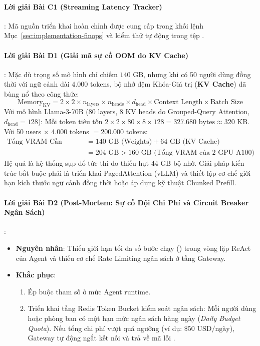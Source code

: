 \paragraph{Lời giải Bài C1 (Streaming Latency Tracker)}:
Mã nguồn triển khai hoàn chỉnh được cung cấp trong khối lệnh Mục~\ref{sec:implementation-finops} và kiểm thử tự động trong tệp .

\paragraph{Lời giải Bài D1 (Giải mã sự cố OOM do KV Cache)}:
Mặc dù trọng số mô hình chỉ chiếm $140\text{ GB}$, nhưng khi có 50 người dùng đồng thời với ngữ cảnh dài $4.000$ tokens, bộ nhớ đệm Khóa-Giá trị (\textbf{KV Cache}) đã bùng nổ theo công thức:
\begin{equation*}
\text{Memory}_{\text{KV}} = 2 \times 2 \times n_{\text{layers}} \times n_{\text{heads}} \times d_{\text{head}} \times \text{Context Length} \times \text{Batch Size}
\end{equation*}
Với mô hình Llama-3-70B ($80$ layers, $8$ KV heads do Grouped-Query Attention, $d_{\text{head}}=128$):
Mỗi token tiêu tốn $2 \times 2 \times 80 \times 8 \times 128 = 327.680\text{ bytes} \approx 320\text{ KB}$.
Với 50 users $\times$ 4.000 tokens $= 200.000\text{ tokens}$:
\begin{align*}
\text{Tổng VRAM Cần Thiết} &= 140\text{ GB (Weights)} + 64\text{ GB (KV Cache)} \\
&= 204\text{ GB} > 160\text{ GB (Tổng VRAM của 2 GPU A100)}
\end{align*}
Hệ quả là hệ thống sụp đổ tức thì do thiếu hụt $44\text{ GB}$ bộ nhớ. Giải pháp kiến trúc bắt buộc phải là triển khai PagedAttention (vLLM) và thiết lập cơ chế giới hạn kích thước ngữ cảnh đồng thời hoặc áp dụng kỹ thuật Chunked Prefill.

\paragraph{Lời giải Bài D2 (Post-Mortem: Sự cố Đội Chi Phí và Circuit Breaker Ngân Sách)}:
\begin{itemize}
  \item \textbf{Nguyên nhân}: Thiếu giới hạn tối đa số bước chạy () trong vòng lặp ReAct của Agent và thiếu cơ chế Rate Limiting ngân sách ở tầng Gateway.
  \item \textbf{Khắc phục}:
    \begin{enumerate}
      \item Ép buộc tham số  ở mức Agent runtime.
      \item Triển khai tầng Redis Token Bucket kiểm soát ngân sách: Mỗi người dùng hoặc phòng ban có một hạn mức ngân sách hàng ngày (\textit{Daily Budget Quota}). Nếu tổng chi phí vượt quá ngưỡng (ví dụ: $\$50\text{ USD/ngày}$), Gateway tự động ngắt kết nối và trả về mã lỗi .
    \end{enumerate}
\end{itemize}
